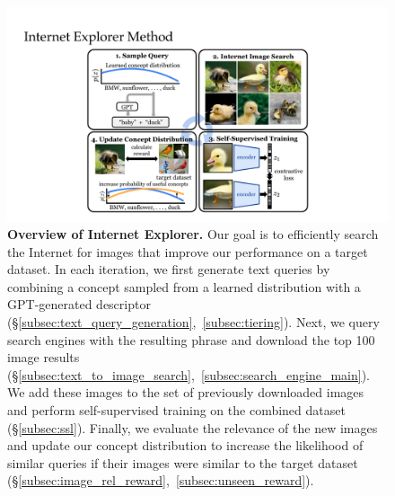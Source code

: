 \begin{figure}[!b]
    \centering
    \includegraphics[width=0.8\linewidth]{figures/method_fig2.pdf}
    \caption{\textbf{Overview of Internet Explorer.} Our goal is to efficiently search the Internet for images that improve our performance on a target dataset.
        In each iteration, we first generate text queries by combining a concept sampled from a learned distribution with a GPT-generated descriptor (\S\ref{subsec:text_query_generation},~\ref{subsec:tiering}). Next, we query search engines with the resulting phrase and download the top 100 image results (\S\ref{subsec:text_to_image_search},~\ref{subsec:search_engine_main}). We add these images to the set of previously downloaded images and perform self-supervised training on the combined dataset (\S\ref{subsec:ssl}). Finally, we evaluate the relevance of the new images and update our concept distribution to increase the likelihood of similar queries if their images were similar to the target dataset (\S\ref{subsec:image_rel_reward},~\ref{subsec:unseen_reward}).
    }
    \label{fig:method}
\end{figure}

